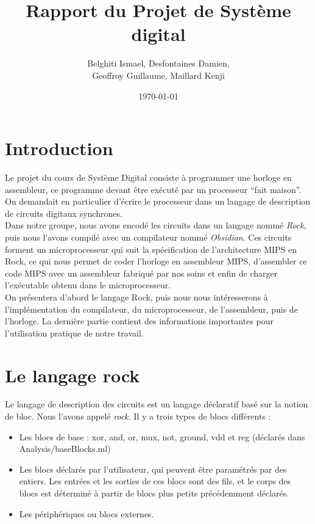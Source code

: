 \documentclass[13pt]{article}
\title{Rapport du Projet de Système digital \no3}
\author{Belghiti Ismael, Desfontaines Damien,\\ Geoffroy Guillaume, Maillard Kenji}
\date{\today}
\begin{document}
\renewcommand{\labelitemi}{$\triangleright$}

\maketitle
\newpage
\tableofcontents
\newpage
\section{Introduction}
Le projet du cours de Système Digital consiste à programmer une horloge en
assembleur, ce programme devant être exécuté par un processeur ``fait maison''.
On demandait en particulier d'écrire le processeur dans un langage de description de circuits digitaux
synchrones.\\
Dans notre groupe, nous avons encodé les 
circuits dans un langage nommé \emph{Rock}, puis nous l'avons compilé avec un
compilateur nommé \emph{Obsidian}. Ces circuits forment un microprocesseur qui
suit la spécification de l'architecture MIPS en Rock, ce qui nous permet de 
coder l'horloge en assembleur MIPS, d'assembler ce code MIPS avec un assembleur 
fabriqué par nos soins et enfin de charger l'exécutable obtenu dans le 
microprocesseur.\\
On présentera d'abord le langage Rock, puis nous nous intéresserons à l'implémentation
du compilateur, du microprocesseur, de l'assembleur, puis de l'horloge. La
dernière partie contient des informations importantes pour l'utilisation 
pratique de notre travail.


\section{Le langage rock}

Le langage de description des circuits est un langage déclaratif basé sur la
notion de bloc. Nous l'avons appelé \emph{rock}. Il y a trois types de blocs différents :
\begin{itemize}
\item Les blocs de base : xor, and, or, mux, not, ground, vdd et reg (déclarés dans Analysis/baseBlocks.ml)
\item Les blocs déclarés par l'utilisateur, qui peuvent être paramétrés par des
entiers. Les entrées et les sorties de ces blocs sont des fils, et le corps des
blocs est déterminé à partir de blocs plus petits précédemment déclarés. 
\item Les périphériques ou blocs externes.
\end{itemize}
\end{document}
